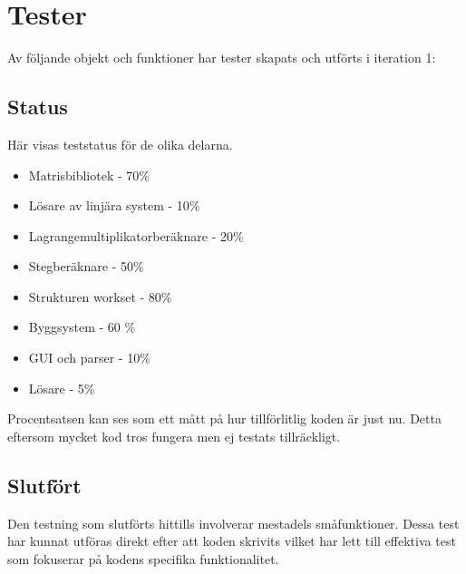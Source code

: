 \section{Tester}
Av följande objekt och funktioner har tester skapats och utförts i iteration 1:

\subsection{Status}
Här visas teststatus för de olika delarna.
\begin{itemize}
\item{Matrisbibliotek - 70\%}
\item{Lösare av linjära system - 10\%}
\item{Lagrangemultiplikatorberäknare - 20\%}
\item{Stegberäknare - 50\%}
\item{Strukturen work\underline{\space}set - 80\%}
\item{Byggsystem - 60 \%}
\item{GUI och parser - 10\%}
\item{Lösare - 5\%}
\end{itemize}
\raggedright Procentsatsen kan ses som ett mått på hur tillförlitlig koden är just nu. Detta eftersom mycket kod tros fungera men ej testats tillräckligt. 

\newpage
\subsection{Slutfört}
Den testning som slutförts hittills involverar mestadels småfunktioner. Dessa test har kunnat utföras direkt efter att koden skrivits vilket har lett till effektiva test som fokuserar på kodens specifika funktionalitet.
